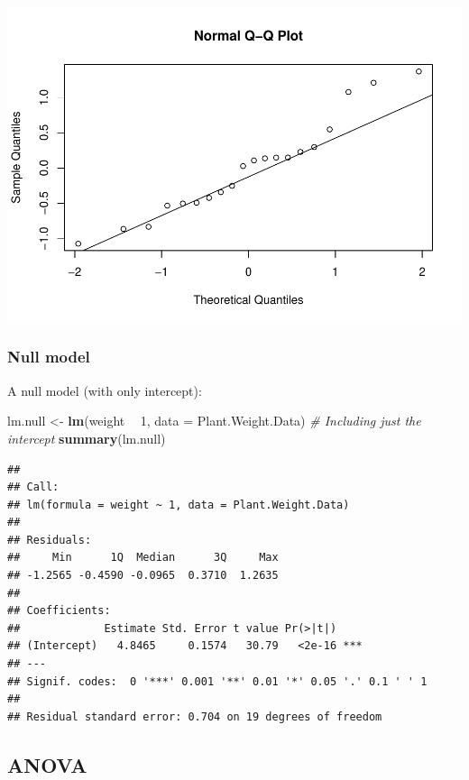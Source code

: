 \documentclass[
]{book}
\newenvironment{Shaded}{\begin{snugshade}}{\end{snugshade}}
\newcommand{\CommentTok}[1]{\textcolor[rgb]{0.56,0.35,0.01}{\textit{#1}}}
\newcommand{\DataTypeTok}[1]{\textcolor[rgb]{0.13,0.29,0.53}{#1}}
\newcommand{\DecValTok}[1]{\textcolor[rgb]{0.00,0.00,0.81}{#1}}
\newcommand{\KeywordTok}[1]{\textcolor[rgb]{0.13,0.29,0.53}{\textbf{#1}}}
\newcommand{\NormalTok}[1]{#1}
\newcommand{\OperatorTok}[1]{\textcolor[rgb]{0.81,0.36,0.00}{\textbf{#1}}}
\newcommand{\StringTok}[1]{\textcolor[rgb]{0.31,0.60,0.02}{#1}}
\begin{document}
\includegraphics{SurveyBook_files/figure-latex/simpleAnalysis224-1.pdf}

\hypertarget{null-model}{%
\subsubsection{Null model}\label{null-model}}

A null model (with only intercept):

\begin{Shaded}
\begin{Highlighting}[]
\NormalTok{lm.null <-}\StringTok{ }\KeywordTok{lm}\NormalTok{(weight }\OperatorTok{~}\StringTok{ }\DecValTok{1}\NormalTok{, }\DataTypeTok{data =}\NormalTok{ Plant.Weight.Data) }\CommentTok{# Including just the intercept}
\KeywordTok{summary}\NormalTok{(lm.null)}
\end{Highlighting}
\end{Shaded}

\begin{verbatim}
## 
## Call:
## lm(formula = weight ~ 1, data = Plant.Weight.Data)
## 
## Residuals:
##     Min      1Q  Median      3Q     Max 
## -1.2565 -0.4590 -0.0965  0.3710  1.2635 
## 
## Coefficients:
##             Estimate Std. Error t value Pr(>|t|)    
## (Intercept)   4.8465     0.1574   30.79   <2e-16 ***
## ---
## Signif. codes:  0 '***' 0.001 '**' 0.01 '*' 0.05 '.' 0.1 ' ' 1
## 
## Residual standard error: 0.704 on 19 degrees of freedom
\end{verbatim}

\hypertarget{anova}{%
\subsection{ANOVA}\label{anova}}
\end{document}
